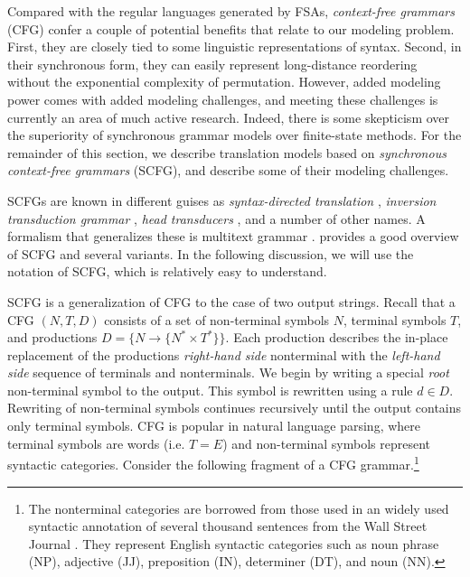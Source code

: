 Compared with the regular languages generated by FSAs,
{\em context-free grammars} (CFG) confer a couple of potential benefits
that relate to our modeling problem.  First, they are closely tied
to some linguistic representations of syntax.  Second, in their
synchronous form, they can easily represent long-distance reordering
without the exponential complexity of permutation.  However, added modeling
power comes with added modeling challenges, and meeting these challenges
is currently an area of much active research.  Indeed, there is some
skepticism over the superiority of synchronous grammar models over
finite-state methods.  For the remainder of this section, we
describe translation models based on 
{\em synchronous context-free grammars} (SCFG), and
describe some of their modeling challenges.

SCFGs are known in different guises as 
{\em syntax-directed translation}
\citep{Lewis:1968:acm}, {\em inversion transduction grammar}
\citep{Wu:1995:ijcai}, {\em head transducers}
\citep{Alshawi:2000:cl}, and a number of other names.
A formalism that generalizes
these is multitext grammar \citep{Melamed:2003:naacl-main}.
\citet{Chiang:2006:tut} provides a good overview of SCFG and
several variants.  In the following discussion, 
we will use the notation of
SCFG, which is relatively easy to understand.

SCFG is a generalization of CFG to the case
of two output strings.  Recall that
a CFG $(N,T,D)$ consists of a set of non-terminal symbols $N$, 
terminal symbols $T$, and productions 
$D=\{N \rightarrow \{N^* \times T^*\}\}$.  
Each production describes the in-place replacement
of the productions {\em right-hand side} nonterminal
with the {\em left-hand side} sequence of terminals
and nonterminals.
We begin by writing a special {\em root} 
non-terminal symbol to the output. 
This symbol is rewritten using a rule $d \in D$.  
Rewriting of non-terminal symbols continues recursively
until the output contains only terminal symbols. 
CFG is popular in natural language parsing, where
terminal symbols are words (i.e. $T = E$)
and non-terminal symbols 
represent syntactic categories.  Consider the following 
fragment of a CFG grammar.\footnote{The 
nonterminal categories are borrowed from those used
in an widely used syntactic annotation of several thousand
sentences from the Wall Street Journal \citep{Marcus:1993:cl}.
They represent English syntactic categories such
as noun phrase (NP), 
adjective (JJ), preposition (IN), determiner (DT), and
noun (NN).}


